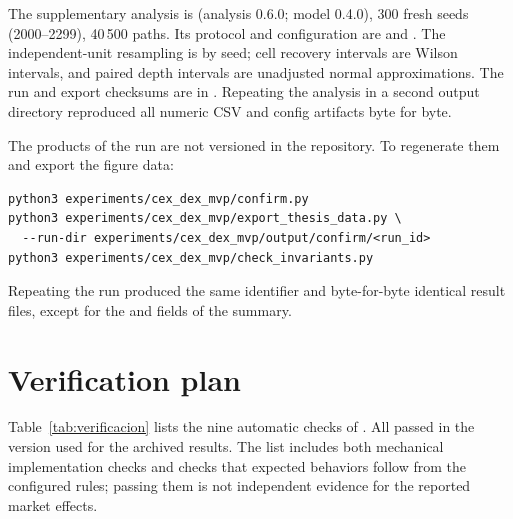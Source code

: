 The supplementary analysis is  (analysis 0.6.0; model 0.4.0), 300 fresh seeds (2000--2299), 40\,500 paths. Its protocol and configuration are  and . The independent-unit resampling is by seed; cell recovery intervals are Wilson intervals, and paired depth intervals are unadjusted normal approximations. The run and export checksums are in . Repeating the analysis in a second output directory reproduced all numeric CSV and config artifacts byte for byte.

The products of the run are not versioned in the repository. To regenerate them and export the figure data:

\begin{verbatim}
python3 experiments/cex_dex_mvp/confirm.py
python3 experiments/cex_dex_mvp/export_thesis_data.py \
  --run-dir experiments/cex_dex_mvp/output/confirm/<run_id>
python3 experiments/cex_dex_mvp/check_invariants.py
\end{verbatim}

Repeating the run produced the same identifier and byte-for-byte identical result files, except for the  and  fields of the summary.

\section{Verification plan}
\label{sec:verificacion}

Table~\ref{tab:verificacion} lists the nine automatic checks of . All passed in the version used for the archived results. The list includes both mechanical implementation checks and checks that expected behaviors follow from the configured rules; passing them is not independent evidence for the reported market effects.

